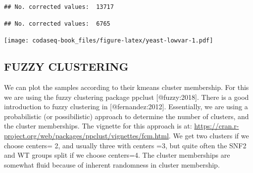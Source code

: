 \documentclass[
  onecolumn]{article}
\newenvironment{Shaded}{\begin{snugshade}}{\end{snugshade}}
\newcommand{\AttributeTok}[1]{\textcolor[rgb]{0.77,0.63,0.00}{#1}}
\newcommand{\CommentTok}[1]{\textcolor[rgb]{0.56,0.35,0.01}{\textit{#1}}}
\newcommand{\ConstantTok}[1]{\textcolor[rgb]{0.00,0.00,0.00}{#1}}
\newcommand{\DecValTok}[1]{\textcolor[rgb]{0.00,0.00,0.81}{#1}}
\newcommand{\FunctionTok}[1]{\textcolor[rgb]{0.00,0.00,0.00}{#1}}
\newcommand{\NormalTok}[1]{#1}
\newcommand{\OtherTok}[1]{\textcolor[rgb]{0.56,0.35,0.01}{#1}}
\newcommand{\SpecialCharTok}[1]{\textcolor[rgb]{0.00,0.00,0.00}{#1}}
\newcommand{\StringTok}[1]{\textcolor[rgb]{0.31,0.60,0.02}{#1}}
\begin{document}
\begin{verbatim}
## No. corrected values:  13717
\end{verbatim}

\begin{verbatim}
## No. corrected values:  6765
\end{verbatim}

\texttt{[image: codaseq-book\_files/figure-latex/yeast-lowvar-1.pdf]}
\clearpage

\hypertarget{fuzzy-clustering}{%
\subsection{FUZZY CLUSTERING}\label{fuzzy-clustering}}

We can plot the samples according to their kmeans cluster membership. For this we are using the fuzzy clustering package ppclust {[}@fuzzy:2018{]}. There is a good introduction to fuzzy clustering in {[}@fernandez:2012{]}. Essentially, we are using a probabilistic (or possibilistic) approach to determine the number of clusters, and the cluster memberships. The vignette for this approach is at: \url{https://cran.r-project.org/web/packages/ppclust/vignettes/fcm.html}. We get two clusters if we choose centers= 2, and usually three with centers =3, but quite often the SNF2 and WT groups split if we choose centers=4. The cluster memberships are somewhat fluid because of inherent randomness in cluster membership.

\begin{Shaded}
\end{Shaded}
\end{document}
